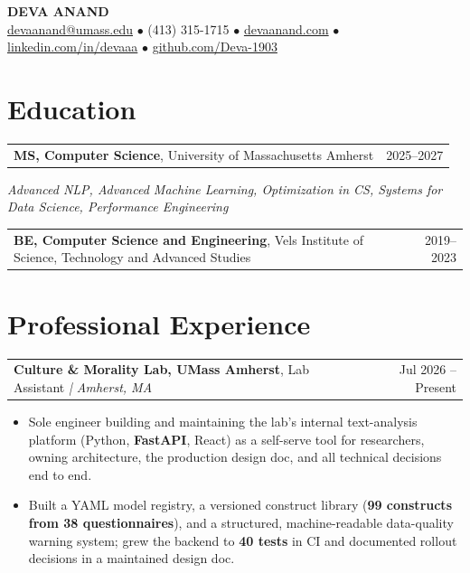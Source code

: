 \documentclass[letterpaper,11pt]{article}
\makeatletter
\newcommand{\eduItem}[3]{%
  \begin{tabular*}{\textwidth}{@{}l@{\extracolsep{\fill}}r@{}}
    \textbf{#1}, #2 & #3 \\
  \end{tabular*}\par
}
\newcommand{\expItem}[4]{%
  \vspace{2pt}
  \begin{tabular*}{\textwidth}{@{}l@{\extracolsep{\fill}}r@{}}
    \textbf{#1}, #2 \textit{| #3} & #4 \\
  \end{tabular*}\par\vspace{-3pt}
}
\makeatother
\begin{document}
\begin{center}
    {\fontsize{18}{20}\selectfont\bfseries DEVA ANAND}\\ \vspace{3pt}
    {\small
    \href{mailto:devaanand@umass.edu}{devaanand@umass.edu}
    \enspace$\bullet$\enspace
    (413) 315-1715
    \enspace$\bullet$\enspace
    \href{https://devaanand.com}{devaanand.com}
    \enspace$\bullet$\enspace
    \href{https://linkedin.com/in/devaaa/}{linkedin.com/in/devaaa}
    \enspace$\bullet$\enspace
    \href{https://github.com/Deva-1903}{github.com/Deva-1903}}
\end{center}
\vspace{-8pt}

\section{Education}
\eduItem{MS, Computer Science}{University of Massachusetts Amherst}{2025--2027}
{\small\textit{Advanced NLP, Advanced Machine Learning, Optimization in CS, Systems for Data Science, Performance Engineering}}\par
\vspace{3pt}
\eduItem{BE, Computer Science and Engineering}{Vels Institute of Science, Technology and Advanced Studies}{2019--2023}

\section{Professional Experience}

\expItem{Culture \& Morality Lab, UMass Amherst}{Lab Assistant}{Amherst, MA}{Jul 2026 -- Present}
\begin{itemize}
  \item Sole engineer building and maintaining the lab's internal text-analysis platform (Python, \textbf{FastAPI}, React) as a self-serve tool for researchers, owning architecture, the production design doc, and all technical decisions end to end.
  \item Built a YAML model registry, a versioned construct library (\textbf{99 constructs from 38 questionnaires}), and a structured, machine-readable data-quality warning system; grew the backend to \textbf{40 tests} in CI and documented rollout decisions in a maintained design doc.
\end{itemize}
\end{document}
